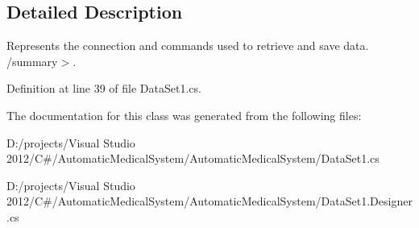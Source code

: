 \subsection{Detailed Description}
Represents the connection and commands used to retrieve and save data. /summary$>$. 

Definition at line 39 of file DataSet1.cs.

The documentation for this class was generated from the following files:\begin{CompactItemize}
\item 
D:/projects/Visual Studio 2012/C\#/AutomaticMedicalSystem/AutomaticMedicalSystem/DataSet1.cs\item 
D:/projects/Visual Studio 2012/C\#/AutomaticMedicalSystem/AutomaticMedicalSystem/DataSet1.Designer.cs\end{CompactItemize}
